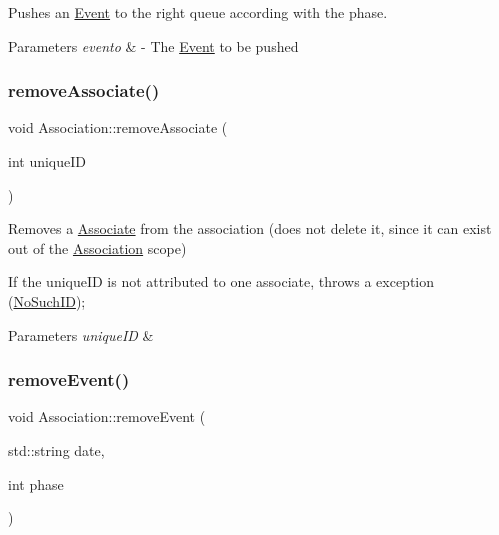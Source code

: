Pushes an \mbox{\hyperlink{classEvent}{Event}} to the right queue according with the phase. 


\begin{DoxyParams}{Parameters}
{\em evento} & -\/ The \mbox{\hyperlink{classEvent}{Event}} to be pushed \\
\hline
\end{DoxyParams}
\mbox{\label{classAssociation_ab0f1b461051c5a7844e6ce490b7caea1}} 
\subsubsection{\texorpdfstring{remove\+Associate()}{removeAssociate()}}
{\footnotesize\ttfamily void Association\+::remove\+Associate (\begin{DoxyParamCaption}\item[{int}]{unique\+ID }\end{DoxyParamCaption})}



Removes a \mbox{\hyperlink{classAssociate}{Associate}} from the association (does not delete it, since it can exist out of the \mbox{\hyperlink{classAssociation}{Association}} scope) 

If the unique\+ID is not attributed to one associate, throws a exception (\mbox{\hyperlink{classNoSuchID}{No\+Such\+ID}}); 
\begin{DoxyParams}{Parameters}
{\em unique\+ID} & \\
\hline
\end{DoxyParams}
\mbox{\label{classAssociation_a672445f247a9bab36b87e770f4b0f512}} 
\subsubsection{\texorpdfstring{remove\+Event()}{removeEvent()}}
{\footnotesize\ttfamily void Association\+::remove\+Event (\begin{DoxyParamCaption}\item[{std\+::string}]{date,  }\item[{int}]{phase }\end{DoxyParamCaption})}



